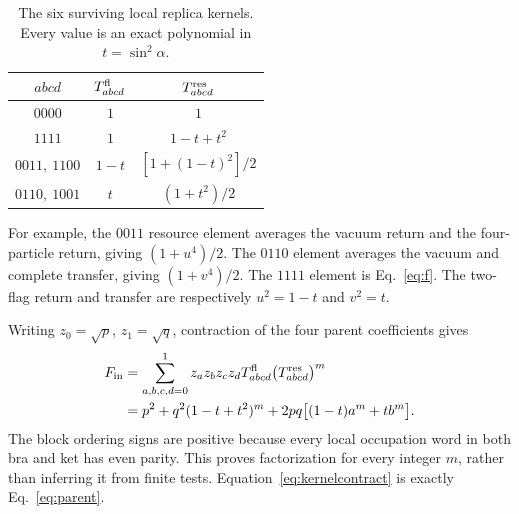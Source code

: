 \documentclass[aps,pra,reprint,amsmath,amssymb,longbibliography,floatfix]{revtex4-2}
\newcommand{\Ftw}{F}
\begin{document}
\begin{table}[b]
 \caption{The six surviving local replica kernels. Every value
 is an exact polynomial in \(t=\sin^2\alpha\).}
 \label{tab:kernels}
 \begin{ruledtabular}
 \begin{tabular}{ccc}
 \(abcd\)&\(T^{\rm fl}_{abcd}\)&\(T^{\rm res}_{abcd}\)\\
 \hline
 \(0000\)&\(1\)&\(1\)\\
 \(1111\)&\(1\)&\(1-t+t^2\)\\
 \(0011,\ 1100\)&\(1-t\)&\([1+(1-t)^2]/2\)\\
 \(0110,\ 1001\)&\(t\)&\((1+t^2)/2\)
 \end{tabular}
 \end{ruledtabular}
\end{table}

For example, the \(0011\) resource element averages the
vacuum return and the four-particle return, giving
\((1+u^4)/2\). The \(0110\) element averages the vacuum
and complete transfer, giving \((1+v^4)/2\).
The \(1111\) element is Eq.~\eqref{eq:f}.
The two-flag return and transfer are respectively \(u^2=1-t\)
and \(v^2=t\).

Writing \(z_0=\sqrt p\), \(z_1=\sqrt q\), contraction of the
four parent coefficients gives
\begin{align}
 \Ftw_{\rm in}
   &=\sum_{a,b,c,d=0}^1 z_a z_b z_c z_d
          T^{\rm fl}_{abcd}
          \bigl(T^{\rm res}_{abcd}\bigr)^m\nonumber\\
   &=p^2+q^2(1-t+t^2)^m
          +2pq\bigl[(1-t)a^m+t b^m\bigr].
 \label{eq:kernelcontract}
\end{align}
The block ordering signs are positive because every local
occupation word in both bra and ket has even parity.
This proves factorization for every integer \(m\), rather
than inferring it from finite tests.
Equation~\eqref{eq:kernelcontract} is exactly
Eq.~\eqref{eq:parent}.


\end{document}
